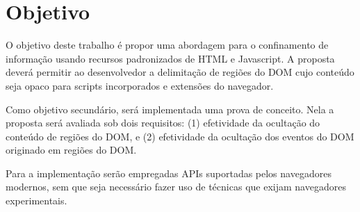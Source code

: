 \section{Objetivo}



O objetivo deste trabalho é propor uma abordagem para o confinamento de informação usando recursos padronizados de HTML e Javascript. A proposta deverá permitir ao desenvolvedor a delimitação de regiões do DOM cujo conteúdo seja opaco para scripts incorporados e extensões do navegador.

Como objetivo secundário, será implementada uma prova de conceito. Nela a proposta será avaliada sob dois requisitos: (1) efetividade da ocultação do conteúdo de regiões do DOM, e (2) efetividade da ocultação dos eventos do DOM originado em regiões do DOM.

Para a implementação serão empregadas APIs suportadas pelos navegadores modernos, sem que seja necessário fazer uso de técnicas que exijam navegadores experimentais.